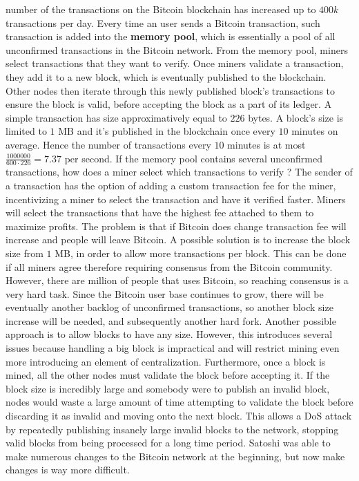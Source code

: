 number of the transactions on the Bitcoin blockchain has increased up to $400k$ transactions per day. Every time an user sends a Bitcoin transaction, such transaction is added into the \textbf{memory pool}, which is essentially a pool of all unconfirmed transactions in the Bitcoin network. From the memory pool, miners select transactions that they want to verify. Once miners validate a transaction, they add it to a new block, which is eventually published to the blockchain. Other nodes then iterate through this newly published block's transactions to ensure the block is valid, before accepting the block as a part of its ledger. A simple transaction has size approximatively equal to $226$ bytes. A block's size is limited to $1$ MB and it's published in the blockchain once every $10$ minutes on average. Hence the number of transactions every $10$ minutes is at most $\frac{1000000}{600 \cdot 226} = 7.37$ per second. If the memory pool contains several unconfirmed transactions, how does a miner select which transactions to verify ? The sender of a transaction has the option of adding a custom transaction fee for the miner, incentivizing a miner to select the transaction and have it verified faster. Miners will select the transactions that have the highest fee attached to them to maximize profits. The problem is that if Bitcoin does change transaction fee will increase and people will leave Bitcoin. A possible solution is to increase the block size from $1$ MB, in order to allow more transactions per block. This can be done if all miners agree therefore requiring consensus from the Bitcoin community. However, there are million of people that uses Bitcoin, so reaching consensus is a very hard task. Since the Bitcoin user base continues to grow, there will be eventually another backlog of unconfirmed transactions, so another block size increase will be needed, and subsequently another hard fork. Another possible approach is to allow blocks to have any size. However, this introduces several issues because handling a big block is impractical and will restrict mining even more introducing an element of centralization. Furthermore, once a block is mined, all the other nodes must validate the block before accepting it. If the block size is incredibly large and somebody were to publish an invalid block, nodes would waste a large amount of time attempting to validate the block before discarding it as invalid and moving onto the next block. This allows a DoS attack by repeatedly publishing insanely large invalid blocks to the network, stopping valid blocks from being processed for a long time period. Satoshi was able to make numerous changes to the Bitcoin network at the beginning, but now make changes is way more difficult. 

